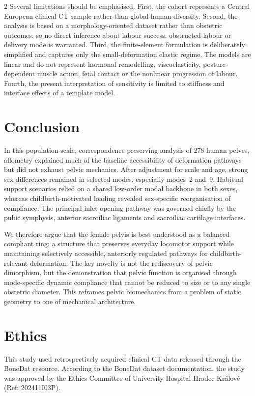 \documentclass[openacc]{rsproca_new}
\begin{document}
\begin{multicols}{2}
Several limitations should be emphasised. First, the cohort represents a Central European clinical CT sample rather than global human diversity. Second, the analysis is based on a morphology-oriented dataset rather than obstetric outcomes, so no direct inference about labour success, obstructed labour or delivery mode is warranted. Third, the finite-element formulation is deliberately simplified and captures only the small-deformation elastic regime. The models are linear and do not represent hormonal remodelling, viscoelasticity, posture-dependent muscle action, fetal contact or the nonlinear progression of labour. Fourth, the present interpretation of sensitivity is limited to stiffness and interface effects of a template model.

\section{Conclusion}

In this population-scale, correspondence-preserving analysis of 278 human pelves, allometry explained much of the baseline accessibility of deformation pathways but did not exhaust pelvic mechanics. After adjustment for scale and age, strong sex differences remained in selected modes, especially modes~2 and~9. Habitual support scenarios relied on a shared low-order modal backbone in both sexes, whereas childbirth-motivated loading revealed sex-specific reorganisation of compliance. The principal inlet-opening pathway was governed chiefly by the pubic symphysis, anterior sacroiliac ligaments and sacroiliac cartilage interfaces.

We therefore argue that the female pelvis is best understood as a balanced compliant ring: a structure that preserves everyday locomotor support while maintaining selectively accessible, anteriorly regulated pathways for childbirth-relevant deformation. The key novelty is not the rediscovery of pelvic dimorphism, but the demonstration that pelvic function is organised through mode-specific dynamic compliance that cannot be reduced to size or to any single obstetric diameter. This reframes pelvic biomechanics from a problem of static geometry to one of mechanical architecture.

\section*{Ethics}

This study used retrospectively acquired clinical CT data released through the BoneDat resource. According to the BoneDat dataset documentation, the study was approved by the Ethics Committee of University Hospital Hradec Kr\'{a}lov\'{e} (Ref: 202411I03P).


\end{multicols}
\end{document}
